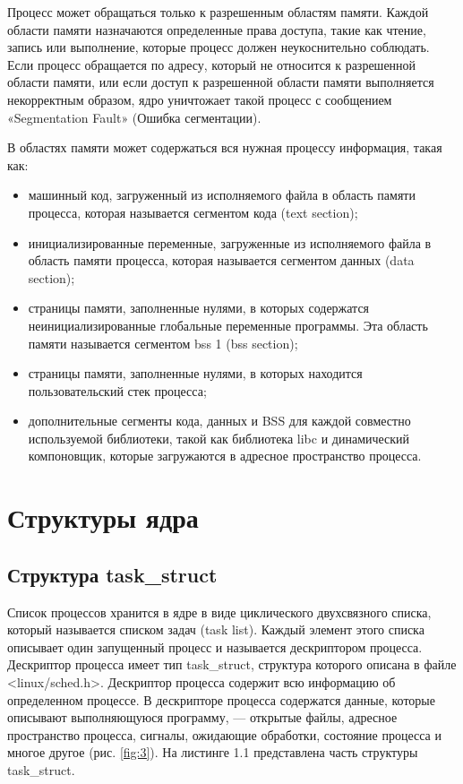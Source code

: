 Процесс может обращаться только к разрешенным областям памяти. 
Каждой области памяти назначаются определенные права доступа, такие как чтение, запись 
или выполнение, которые процесс должен неукоснительно соблюдать. 
Если процесс обращается по адресу, который не относится к разрешенной области памяти, 
или если доступ к разрешенной области памяти выполняется некорректным образом, ядро уничтожает такой
процесс с сообщением «Segmentation Fault» (Ошибка сегментации).

В областях памяти может содержаться вся нужная процессу информация, такая как:

\begin{itemize}
	\item машинный код, загруженный из исполняемого файла в область памяти процесса, которая называется сегментом кода (text section);
	\item инициализированные переменные, загруженные из исполняемого файла в область памяти процесса, которая называется сегментом данных (data section);
	\item страницы памяти, заполненные нулями, в которых содержатся неинициализированные глобальные переменные программы. Эта область памяти называется сегментом bss 1 (bss section);
	\item страницы памяти, заполненные нулями, в которых находится пользовательский стек процесса;
	\item дополнительные сегменты кода, данных и BSS для каждой совместно используемой библиотеки, такой как библиотека libc и динамический компоновщик, которые загружаются в адресное пространство процесса.
\end{itemize}

\section{Структуры ядра}

\subsection{Структура task\_struct}

Список процессов хранится в ядре в виде циклического двухсвязного списка, 
который называется списком задач (task list). 
Каждый элемент этого списка описывает один
запущенный процесс и называется дескриптором процесса. Дескриптор процесса имеет
тип task\_struct, структура которого описана в файле <linux/sched.h>. 
Дескриптор процесса содержит всю информацию об определенном процессе.
В дескрипторе процесса содержатся данные, которые описывают выполняющуюся
программу, — открытые файлы, адресное пространство процесса, сигналы, ожидающие
обработки, состояние процесса и многое другое (рис. \ref{fig:3}). 
На листинге 1.1 представлена часть структуры task\_struct.

